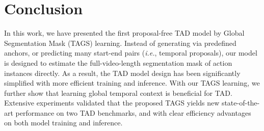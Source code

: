 \documentclass[runningheads]{llncs}
\newcommand{\ie}{\textit{i.e.}}
\newcommand{\shortmodelname}{TAGS}
\begin{document}
\section{Conclusion}
In this work, we have presented the first proposal-free TAD model by Global Segmentation Mask ({\shortmodelname}) learning. Instead of generating via predefined anchors, or predicting many start-end pairs (\ie, temporal proposals), our model is designed to estimate the full-video-length segmentation mask of action instances directly. As a result, the TAD model design has been significantly simplified with more efficient training and inference. With our {\shortmodelname} learning, we further show that learning global temporal context is beneficial for TAD. Extensive experiments validated that the proposed {\shortmodelname} yields new state-of-the-art performance on two TAD benchmarks, and with clear efficiency advantages on both model training and inference. 






\end{document}
